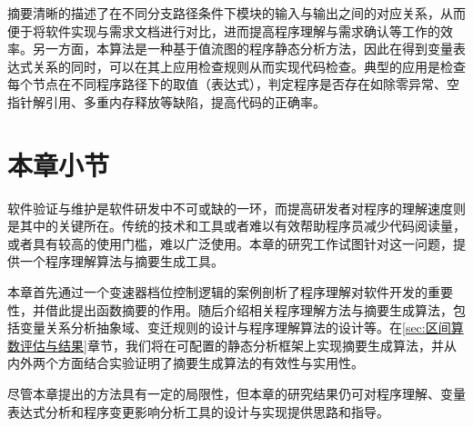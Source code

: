摘要清晰的描述了在不同分支路径条件下模块的输入与输出之间的对应关系，从而便于将软件实现与需求文档进行对比，进而提高程序理解与需求确认等工作的效率。另一方面，本算法是一种基于值流图的程序静态分析方法，因此在得到变量表达式关系的同时，可以在其上应用检查规则从而实现代码检查。典型的应用是检查每个节点在不同程序路径下的取值（表达式），判定程序是否存在如除零异常、空指针解引用、多重内存释放等缺陷，提高代码的正确率。


\section{本章小节}
\label{sec:值流图总结}

软件验证与维护是软件研发中不可或缺的一环，而提高研发者对程序的理解速度则是其中的关键所在。传统的技术和工具或者难以有效帮助程序员减少代码阅读量，或者具有较高的使用门槛，难以广泛使用。本章的研究工作试图针对这一问题，提供一个程序理解算法与摘要生成工具。

本章首先通过一个变速器档位控制逻辑的案例剖析了程序理解对软件开发的重要性，并借此提出函数摘要的作用。随后介绍相关程序理解方法与摘要生成算法，包括变量关系分析抽象域、变迁规则的设计与程序理解算法的设计等。在\ref{sec:区间算数评估与结果}章节，我们将在可配置的静态分析框架上实现摘要生成算法，并从内外两个方面结合实验证明了摘要生成算法的有效性与实用性。

尽管本章提出的方法具有一定的局限性，但本章的研究结果仍可对程序理解、变量表达式分析和程序变更影响分析工具的设计与实现提供思路和指导。








































